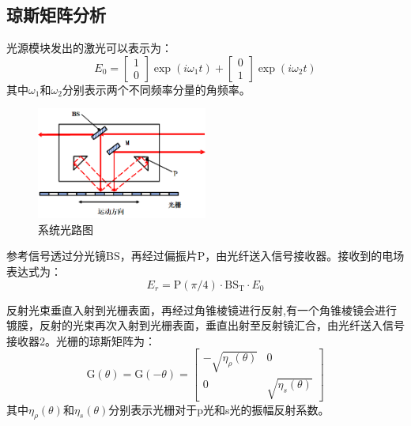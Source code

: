 \documentclass[type=master,oneside]{fduthesis}
\begin{document}
\subsection{琼斯矩阵分析}
光源模块发出的激光可以表示为：
\begin{equation}
  E_{0}=\left[\begin{array}{l}
      1 \\
      0
    \end{array}\right] \exp \left(i \omega_{1} t\right)+\left[\begin{array}{l}
      0 \\
      1
    \end{array}\right] \exp \left(i \omega_{2} t\right)
\end{equation}
其中$\omega_{1}$和$\omega_{2}$分别表示两个不同频率分量的角频率。
\begin{figure}[H]
  \centering
  \includegraphics[width=0.5\textwidth]{3-fig//系统光路图.png}
  \caption{系统光路图}
  \label{fig:系统光路图}
\end{figure}

参考信号透过分光镜BS，再经过偏振片P，由光纤送入信号接收器。接收到的电场表达式为：
\begin{equation}
  E_{r}=\mathrm{P}(\pi / 4) \cdot \mathrm{BS}_{\mathrm{T}} \cdot E_{0}
\end{equation}

反射光束垂直入射到光栅表面，再经过角锥棱镜进行反射,有一个角锥棱镜会进行镀膜，反射的光束再次入射到光栅表面，垂直出射至反射镜汇合，由光纤送入信号接收器2。光栅的琼斯矩阵为：
\begin{equation}
  \mathrm{G}(\theta)=\mathrm{G}(-\theta)=\left[\begin{array}{cc}
      -\sqrt{\eta_{\rho}(\theta)} & 0                       \\
      0                           & \sqrt{\eta_{s}(\theta)}
    \end{array}\right]
\end{equation}
其中$\eta_{\rho}(\theta)$和$\eta_{s}(\theta)$分别表示光栅对于p光和s光的振幅反射系数。
\end{document}
